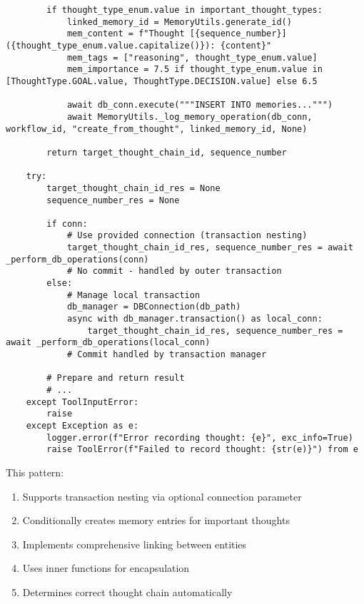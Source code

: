 \documentclass[12pt,a4paper]{article}
\begin{document}
\begin{pageablecode}
\begin{verbatim}
        if thought_type_enum.value in important_thought_types:
            linked_memory_id = MemoryUtils.generate_id()
            mem_content = f"Thought [{sequence_number}] ({thought_type_enum.value.capitalize()}): {content}"
            mem_tags = ["reasoning", thought_type_enum.value]
            mem_importance = 7.5 if thought_type_enum.value in [ThoughtType.GOAL.value, ThoughtType.DECISION.value] else 6.5

            await db_conn.execute("""INSERT INTO memories...""")
            await MemoryUtils._log_memory_operation(db_conn, workflow_id, "create_from_thought", linked_memory_id, None)

        return target_thought_chain_id, sequence_number

    try:
        target_thought_chain_id_res = None
        sequence_number_res = None

        if conn:
            # Use provided connection (transaction nesting)
            target_thought_chain_id_res, sequence_number_res = await _perform_db_operations(conn)
            # No commit - handled by outer transaction
        else:
            # Manage local transaction
            db_manager = DBConnection(db_path)
            async with db_manager.transaction() as local_conn:
                target_thought_chain_id_res, sequence_number_res = await _perform_db_operations(local_conn)
            # Commit handled by transaction manager

        # Prepare and return result
        # ...
    except ToolInputError:
        raise
    except Exception as e:
        logger.error(f"Error recording thought: {e}", exc_info=True)
        raise ToolError(f"Failed to record thought: {str(e)}") from e
\end{verbatim}
\end{pageablecode}
This pattern:
\begin{enumerate}[label=\arabic*.]
    \item Supports transaction nesting via optional connection parameter
    \item Conditionally creates memory entries for important thoughts
    \item Implements comprehensive linking between entities
    \item Uses inner functions for encapsulation
    \item Determines correct thought chain automatically
\end{enumerate}
\end{document}
